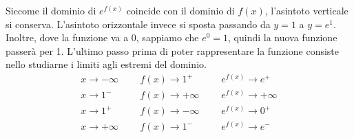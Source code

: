 \documentclass{article}     %
\begin{document}
            Siccome il dominio di $e^{f(x)}$ coincide con il dominio di $f(x)$, l'asintoto verticale si conserva. L'asintoto orizzontale invece si sposta passando da $y=1$ a $y=e^1$. Inoltre, dove la funzione va a 0, sappiamo che $e^0=1$, quindi la nuova funzione passerà per 1. L'ultimo passo prima di poter rappresentare la funzione consiste nello studiarne i limiti agli estremi del dominio.
            \[\renewcommand{\arraystretch}{1.8}\begin{array}{lllll}
                x \rightarrow -\infty &~~~& f(x)\rightarrow 1^+ &~~~& e^{f(x)}\rightarrow e^+\\
                x \rightarrow 1^- &~~~& f(x)\rightarrow +\infty &~~~& e^{f(x)}\rightarrow +\infty\\
                x \rightarrow 1^+ &~~~& f(x)\rightarrow -\infty &~~~& e^{f(x)}\rightarrow 0^+\\
                x \rightarrow +\infty &~~~& f(x)\rightarrow 1^- &~~~& e^{f(x)}\rightarrow e^-\\
            \end{array}\]
\end{document}
